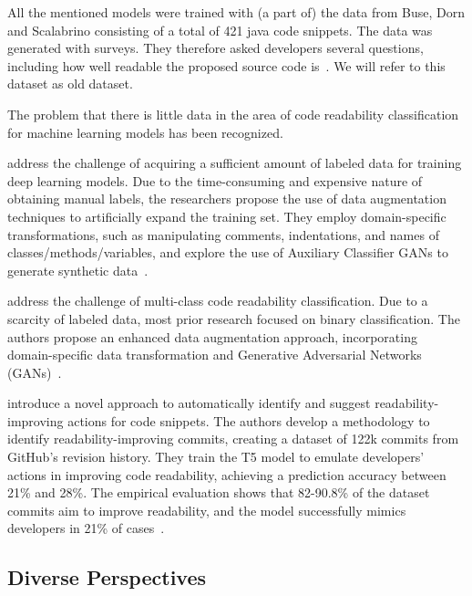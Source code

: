 \documentclass[%
class=scrreprt,
chapterprefix=false,%
open=right,%
twoside=false,%
paper=a4,%
logofile={Logo\_zentral\_farbig\_EN.png},%
thesistype=master,%
UKenglish,%
]{se2thesis}
\theoremstyle{definition}
\begin{document}
	All the mentioned models were trained with (a part of) the data from Buse, Dorn and Scalabrino consisting of a total of 421 java code snippets. The data was generated with surveys. They therefore asked developers several questions, including how well readable the proposed source code is~\cite{buse2009learning, dorn2012general, scalabrino2018comprehensive}. We will refer to this dataset as old dataset.
	
	The problem that there is little data in the area of code readability classification for machine learning models has been recognized.
					
	\citeauthor{mi2021effectiveness} address the challenge of acquiring a sufficient amount of labeled data for training deep learning models. Due to the time-consuming and expensive nature of obtaining manual labels, the researchers propose the use of data augmentation techniques to artificially expand the training set. They employ domain-specific transformations, such as manipulating comments, indentations, and names of classes/methods/variables, and explore the use of Auxiliary Classifier GANs to generate synthetic data~\cite{mi2021effectiveness}.
	
	\citeauthor{mi2022enhanced} address the challenge of multi-class code readability classification. Due to a scarcity of labeled data, most prior research focused on binary classification. The authors propose an enhanced data augmentation approach, incorporating domain-specific data transformation and Generative Adversarial Networks (GANs)~\cite{mi2022enhanced}.
	
	\citeauthor{vitale2023using} introduce a novel approach to automatically identify and suggest readability-improving actions for code snippets. The authors develop a methodology to identify readability-improving commits, creating a dataset of 122k commits from GitHub's revision history. They train the T5 model to emulate developers' actions in improving code readability, achieving a prediction accuracy between 21\% and 28\%. The empirical evaluation shows that 82-90.8\% of the dataset commits aim to improve readability, and the model successfully mimics developers in 21\% of cases~\cite{vitale2023using}.
	
	
\subsection{Diverse Perspectives} \label{Diverse Perspectives}
\end{document}
